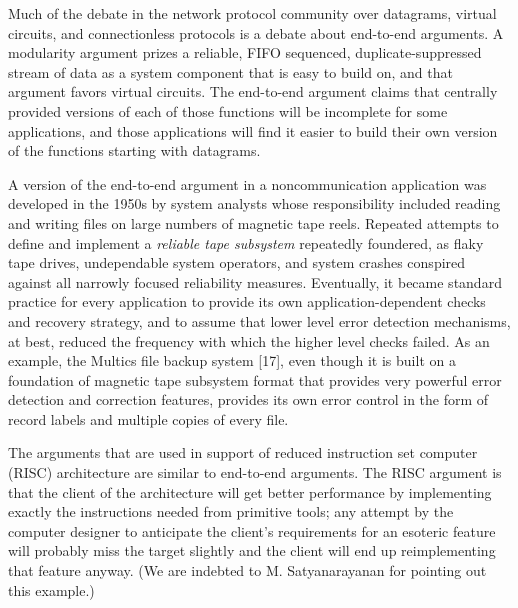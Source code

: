 \documentclass[a4paper,12pt,notitlepage,twoside,openright]{article}
\begin{document}
Much of the debate in the network protocol community over datagrams,
virtual circuits, and connectionless protocols is a debate about
end-to-end arguments. A modularity argument prizes a reliable, FIFO
sequenced, duplicate-suppressed stream of data as a system component
that is easy to build on, and that argument favors virtual circuits. The
end-to-end argument claims that centrally provided versions of each of
those functions will be incomplete for some applications, and those
applications will find it easier to build their own version of the
functions starting with datagrams.

A version of the end-to-end argument in a noncommunication application
was developed in the 1950s by system analysts whose responsibility
included reading and writing files on large numbers of magnetic tape
reels. Repeated attempts to define and implement a \emph{reliable tape
subsystem} repeatedly foundered, as flaky tape drives, undependable
system operators, and system crashes conspired against all narrowly
focused reliability measures. Eventually, it became standard practice
for every application to provide its own application-dependent checks
and recovery strategy, and to assume that lower level error detection
mechanisms, at best, reduced the frequency with which the higher level
checks failed. As an example, the Multics file backup system {[}17{]},
even though it is built on a foundation of magnetic tape subsystem
format that provides very powerful error detection and correction
features, provides its own error control in the form of record labels
and multiple copies of every file.


The arguments that are used in support of reduced instruction set
computer (RISC) architecture are similar to end-to-end arguments. The
RISC argument is that the client of the architecture will get better
performance by implementing exactly the instructions needed from
primitive tools; any attempt by the computer designer to anticipate the
client's requirements for an esoteric feature will probably miss the
target slightly and the client will end up reimplementing that feature
anyway. (We are indebted to M. Satyanarayanan for pointing out this
example.)
\end{document}
